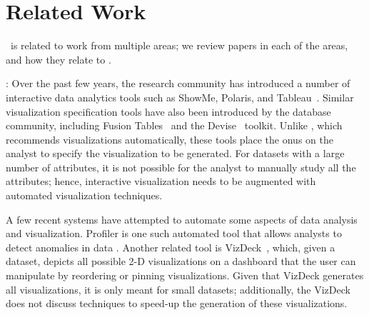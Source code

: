 

\section{Related Work}
\label{sec:related_work}
\VizRecDB\ is related to work from multiple areas;
we review papers in each of the areas, and how they relate to
\VizRecDB. 

:
Over the past few years, the research community has introduced a number of
interactive data analytics tools such as ShowMe, Polaris, and 
Tableau~\cite{DBLP:journals/cacm/StolteTH08, DBLP:journals/tvcg/MackinlayHS07}.
Similar visualization specification tools have also been introduced by the
database community, including Fusion
Tables~\cite{DBLP:conf/sigmod/GonzalezHJLMSSG10} and the
Devise~\cite{DBLP:conf/sigmod/LivnyRBCDLMW97} toolkit. 
Unlike \VizRecDB, which recommends visualizations automatically, these tools place
the onus on the analyst to specify the visualization to be generated.
For datasets with a large number of attributes, it is not possible
for the analyst to manually study all the attributes; hence, interactive
visualization needs to be augmented with automated visualization techniques.

A few recent systems have attempted to automate some aspects of data analysis
and visualization. Profiler is one such automated tool that allows analysts to
detect anomalies in data \cite{DBLP:conf/AVI/KandelPPHH12}.
Another related tool 
is VizDeck~\cite{DBLP:conf/sigmod/KeyHPA12}, which, given a dataset,
depicts all possible 2-D visualizations on a dashboard that the user can
manipulate by reordering or pinning visualizations.
Given that VizDeck generates all visualizations, it is only meant for 
small datasets; additionally, the VizDeck does not discuss techniques
to speed-up the generation of these visualizations. 

